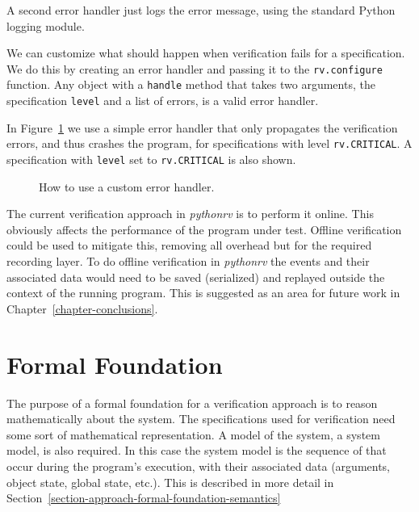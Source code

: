 A second error handler just logs the error message, using the standard Python
logging module.

We can customize what should happen when verification fails for a
specification. We do this by creating an error handler and passing it to the
\texttt{rv.configure} function. Any object with a \texttt{handle} method that
takes two arguments, the specification \texttt{level} and a list of errors, is
a valid error handler.

In Figure~\ref{figure-configure-error-handler} we use a simple error handler
that only propagates the verification errors, and thus crashes the program, for
specifications with level \texttt{rv.CRITICAL}. A specification with
\texttt{level} set to \texttt{rv.CRITICAL} is also shown.

\begin{figure}[h!]
	\begin{center}
	\begin{minipage}{0.7\textwidth}
	
	\end{minipage}
	\end{center}

  \caption{How to use a custom error handler.}
	\label{figure-configure-error-handler}
\end{figure}

The current verification approach in \textit{pythonrv} is to perform it online.
This obviously affects the performance of the program under test. Offline
verification could be used to mitigate this, removing all overhead but for the
required recording layer. To do offline verification in \textit{pythonrv} the
events and their associated data would need to be saved (serialized) and
replayed outside the context of the running program. This is suggested as an
area for future work in Chapter~\ref{chapter-conclusions}.






\section{Formal Foundation} \label{section-approach-formal-foundation}

The purpose of a formal foundation for a verification approach is to reason
mathematically about the system. The specifications used for verification need
some sort of mathematical representation. A model of the system, a system
model, is also required. In this case the system model is the sequence of that
occur during the program's execution, with their associated data (arguments,
object state, global state, etc.). This is described in more detail in
Section~\ref{section-approach-formal-foundation-semantics}

